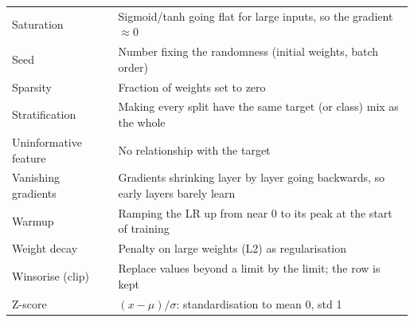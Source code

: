 \documentclass[11pt,a4paper]{article}
\begin{document}
\begin{xltabular}{\linewidth}{@{}>{\raggedright\arraybackslash}p{4.2cm}Y@{}}
Saturation & Sigmoid/tanh going flat for large inputs, so the gradient $\approx 0$ \\
Seed & Number fixing the randomness (initial weights, batch order) \\
Sparsity & Fraction of weights set to zero \\
Stratification & Making every split have the same target (or class) mix as the whole \\
Uninformative feature & No relationship with the target \\
Vanishing gradients & Gradients shrinking layer by layer going backwards, so early layers barely learn \\
Warmup & Ramping the LR up from near 0 to its peak at the start of training \\
Weight decay & Penalty on large weights (L2) as regularisation \\
Winsorise (clip) & Replace values beyond a limit by the limit; the row is kept \\
Z-score & $(x-\mu)/\sigma$: standardisation to mean 0, std 1 \\
\bottomrule
\end{xltabular}
\end{document}

